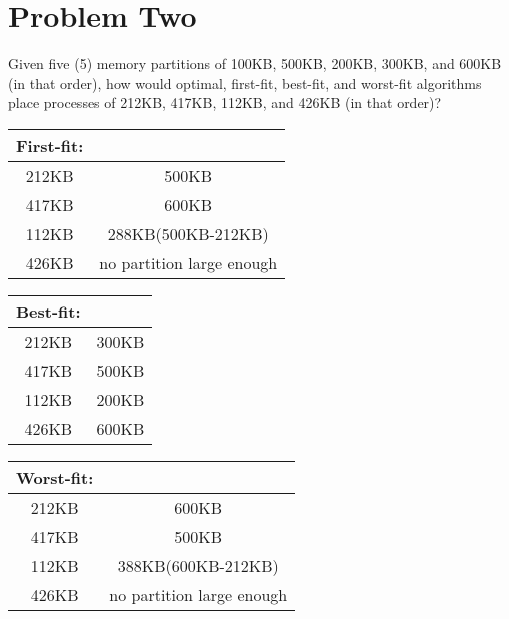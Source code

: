 \documentclass[letterpaper, 10pt,DIV=13]{scrartcl}
\numberwithin{equation}{section} %
\numberwithin{figure}{section} %
\numberwithin{table}{section} %
\begin{document}
\section{Problem Two}
Given	five	(5)	memory	partitions	of	100KB,	500KB,	200KB,	300KB,	and	600KB	(in	that	
order),	how	would	optimal,	first-fit,	best-fit,	and	worst-fit	algorithms	place	processes	
of	212KB,	417KB,	112KB,	and	426KB	(in	that	order)?
\\[12pt]
\begin{tabular}{ c c }
First-fit: \\
\hline
 212KB & 500KB \\ 
 417KB & 600KB \\  
 112KB & 288KB(500KB-212KB) \\  
 426KB & no partition large enough \\
 \hline
\end{tabular}
\break
\begin{tabular}{ c c }
Best-fit: \\
\hline
 212KB & 300KB \\ 
 417KB & 500KB \\  
 112KB & 200KB \\  
 426KB & 600KB \\
 \hline
\end{tabular}
\break
\begin{tabular}{ c c }
Worst-fit: \\
\hline
 212KB & 600KB \\ 
 417KB & 500KB \\  
 112KB & 388KB(600KB-212KB) \\  
 426KB & no partition large enough \\
 \hline
\end{tabular}
\break
\end{document}
